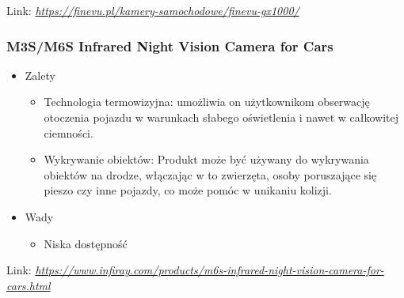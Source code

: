 Link: \textit{\url{https://finevu.pl/kamery-samochodowe/finevu-gx1000/}}


\subsubsection*{M3S/M6S Infrared Night Vision Camera for Cars} %
\begin{itemize}
    \item Zalety
          \begin{itemize}
              \item Technologia termowizyjna: umożliwia on użytkownikom obserwację otoczenia pojazdu
                    w warunkach słabego oświetlenia i nawet w całkowitej ciemności.
              \item Wykrywanie obiektów: Produkt może być używany do wykrywania obiektów na drodze,
                    włączając w to zwierzęta, osoby poruszające się pieszo czy inne pojazdy,
                    co może pomóc w unikaniu kolizji.
          \end{itemize}
    \item Wady
          \begin{itemize}
              \item Niska dostępność
          \end{itemize}
\end{itemize}

Link: \textit{\url{https://www.infiray.com/products/m6s-infrared-night-vision-camera-for-cars.html}}
